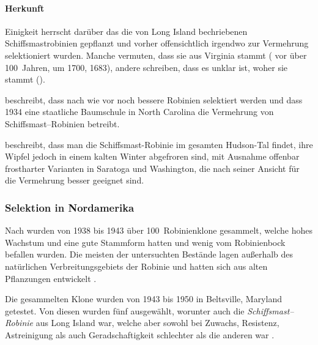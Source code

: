 \documentclass[twocolumn]{scrartcl}
\begin{document}
\paragraph{Herkunft}

Einigkeit herrscht darüber das die von Long Island
bechriebenen Schiffsmastrobinien gepflanzt und vorher offensichtlich
irgendwo zur Vermehrung selektioniert wurden. Manche vermuten, dass sie
aus Virginia stammt (\citet{hicks1883robinie} vor über 100~Jahren,
\citet{raber1936shipmast} um 1700, \citet{detwiler1937robinie} 1683),
andere schreiben, dass es unklar ist, woher sie stammt
(\citet{raber1938robinie}).

\citet{detwiler1937robinie} beschreibt,
dass nach wie vor noch bessere Robinien selektiert werden und dass
1934 eine staatliche Baumschule in North Carolina die Vermehrung von
Schiffsmast--Robinien betreibt.

\citet{cope1938robinie} beschreibt, dass man die Schiffsmast-Robinie im
gesamten Hudson-Tal findet, ihre Wipfel jedoch in einem kalten Winter
abgefroren sind, mit Ausnahme offenbar frostharter Varianten in
Saratoga und Washington, die nach seiner Ansicht für die Vermehrung
besser geeignet sind.

\subsubsection{Selektion in Nordamerika}

Nach \citet{santamour1970robinie,steinergroup1987robinie} wurden von
1938 bis 1943 über 100~Robinienklone gesammelt, welche hohes Wachstum
und eine gute Stammform hatten und wenig vom Robinienbock befallen
wurden. Die meisten der untersuchten Bestände lagen außerhalb des
natürlichen Verbreitungsgebiets der Robinie und hatten sich aus alten
Pflanzungen entwickelt \citep{hopp1941robinie}.

Die gesammelten Klone wurden von 1943 bis 1950 in Beltsville, Maryland
getestet. Von diesen wurden fünf ausgewählt, worunter auch die
\emph{Schiffsmast--Robinie} aus Long Island war, welche aber sowohl
bei Zuwachs, Resistenz, Astreinigung als auch Geradschaftigkeit
schlechter als die anderen war \citep{santamour1960robinie}.
\end{document}
